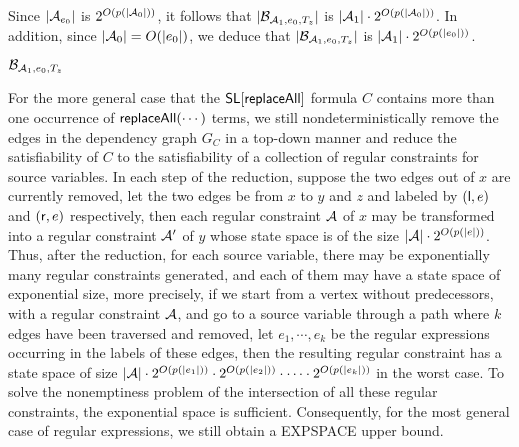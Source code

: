Since $|\mathcal{A}_{e_0}|$ is $2^{O(p(|\mathcal{A}_0|))}$, it follows that $|\mathcal{B}_{\mathcal{A}_1, e_0, T_z}|$ is $|\mathcal{A}_1| \cdot 2^{O(p(|\mathcal{A}_0|))}$. In addition, since $|\mathcal{A}_0|=O(|e_0|)$, we deduce that $|\mathcal{B}_{\mathcal{A}_1, e_0, T_z}|$ is $|\mathcal{A}_1| \cdot 2^{O(p(|e_0|))}$.

\begin{example}
$\mathcal{B}_{\mathcal{A}_1, e_0,  T_{z}}$
\end{example}

For the more general case that the $\mathsf{SL}[\mathsf{replaceAll}]$ formula $C$ contains more than one occurrence of $\mathsf{replaceAll}(\cdots)$ terms, we still nondeterministically remove the edges in the dependency graph $G_C$ in a top-down manner and reduce the satisfiability of $C$ to the satisfiability of a collection of regular constraints for source variables. 
In each step of the reduction, suppose the two edges out of $x$ are currently removed, let the two edges be from $x$ to $y$ and $z$ and labeled by $({\sf l}, e)$ and $({\sf r}, e)$ respectively, then each regular constraint $\mathcal{A}$ of $x$ may be transformed into a regular constraint $\mathcal{A}'$ of $y$ whose state space is of the size $|\mathcal{A}| \cdot 2^{O(p(|e|))}$. Thus, after the reduction, for each source variable, there may be exponentially many regular constraints generated, and each of them may have a state space of exponential size, more precisely, if we start from a vertex without predecessors, with a regular constraint $\mathcal{A}$, and go to a source variable through a path where $k$ edges have been traversed and removed, let $e_1,\cdots, e_k$ be the regular expressions occurring in the labels of these edges, then the resulting regular constraint has a state space of size $|\mathcal{A}| \cdot 2^{O(p(|e_1|))} \cdot 2^{O(p(|e_2|))} \cdot \cdots \cdot 2^{O(p(|e_k|))}$ in the worst case. To solve the nonemptiness problem of the intersection of all these regular constraints, the exponential space is sufficient. Consequently, for the most general case of regular expressions, we still obtain a EXPSPACE upper bound.



